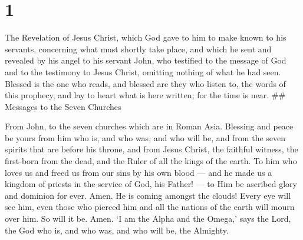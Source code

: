 \hypertarget{section}{%
\section{1}\label{section}}

 The Revelation of Jesus Christ, which God gave to him to
make known to his servants, concerning what must shortly take place, and
which he sent and revealed by his angel to his servant John,
 who testified to the message of God and to the testimony to
Jesus Christ, omitting nothing of what he had seen.  Blessed
is the one who reads, and blessed are they who listen to, the words of
this prophecy, and lay to heart what is here written; for the time is
near. \#\# Messages to the Seven Churches

 From John, to the seven churches which are in Roman Asia.
Blessing and peace be yours from him who is, and who was, and who will
be, and from the seven spirits that are before his throne, 
and from Jesus Christ, the faithful witness, the first-born from the
dead, and the Ruler of all the kings of the earth. To him who loves us
and freed us from our sins by his own blood ---  and he made
us a kingdom of priests in the service of God, his Father! --- to Him be
ascribed glory and dominion for ever. Amen.  He is coming
amongst the clouds! Every eye will see him, even those who pierced him
and all the nations of the earth will mourn over him. So will it be.
Amen.  `I am the Alpha and the Omega,' says the Lord, the
God who is, and who was, and who will be, the Almighty.

